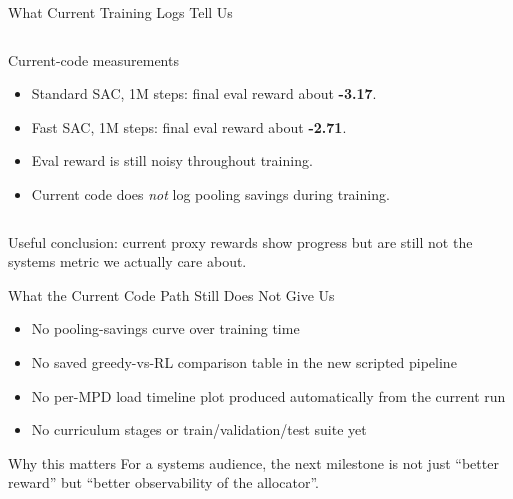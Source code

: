 \documentclass[10pt,aspectratio=169]{beamer}
\begin{document}
\begin{frame}{What Current Training Logs Tell Us}
  \begin{columns}[T,onlytextwidth]
      \begin{block}{Current-code measurements}
        \begin{itemize}
          \item Standard SAC, 1M steps: final eval reward about \textbf{-3.17}.
          \item Fast SAC, 1M steps: final eval reward about \textbf{-2.71}.
          \item Eval reward is still noisy throughout training.
          \item Current code does \emph{not} log pooling savings during training.
        \end{itemize}
      \end{block}
      \centering
  \end{columns}

  \vspace{0.4em}
  {\scriptsize Useful conclusion: current proxy rewards show progress but are still not the systems metric we actually care about.}
\end{frame}

\begin{frame}{What the Current Code Path Still Does Not Give Us}
  \begin{itemize}
    \item No pooling-savings curve over training time
    \item No saved greedy-vs-RL comparison table in the new scripted pipeline
    \item No per-MPD load timeline plot produced automatically from the current run
    \item No curriculum stages or train/validation/test suite yet
  \end{itemize}

  \vspace{0.5em}
  \begin{block}{Why this matters}
    For a systems audience, the next milestone is not just ``better reward'' but ``better observability of the allocator''.
  \end{block}
\end{frame}
\end{document}
